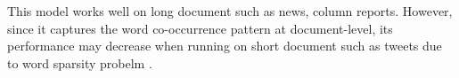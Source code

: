 This model works well on long document such as news, column reports. However, since it captures the word co-occurrence pattern at document-level, its performance may decrease when running on short document such as tweets due to word sparsity probelm \cite{yan2013biterm}. \\\\

